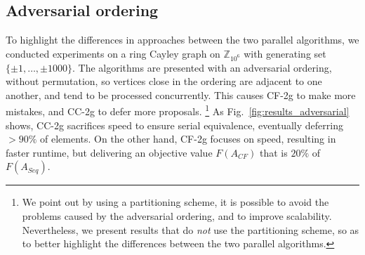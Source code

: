 \documentclass{article} %
\newcommand{\hogwild}{CF-2g}
\newcommand{\occ}{CC-2g}
\newcommand{\hogwildshort}{CF}
\newcommand{\seqalgshort}{Seq}
\newcommand{\Comments}{1}
\newcommand{\note}[2]{\ifnum\Comments=1\textcolor{#1}{#2}\fi}
\newcommand{\xinghao}[1]{\note{red}{[XP: #1]}}
\newcommand{\figref}[1]{Fig.~\ref{#1}}
\begin{document}
\subsection{Adversarial ordering}

To highlight the differences in approaches between the two parallel algorithms, we conducted experiments on a ring Cayley graph on $\mathbb{Z}_{10^6}$ with generating set $\{\pm 1,\dots, \pm 1000\}$.
The algorithms are presented with an adversarial ordering, without permutation, so vertices close in the ordering are adjacent to one another, and tend to be processed concurrently.
This causes \hogwild{} to make more mistakes, and \occ{} to defer more proposals.
\footnote{
We point out by using a partitioning scheme, it is possible to avoid the problems caused by the adversarial ordering, and to improve scalability.
Nevertheless, we present results that do \emph{not} use the partitioning scheme, so as to better highlight the differences between the two parallel algorithms.
}
As \figref{fig:results_adversarial} shows, \occ{}  sacrifices speed to ensure serial equivalence, eventually deferring $>90\%$ of elements.
On the other hand, \hogwild{} focuses on speed, resulting in faster runtime, but delivering an objective value $F(A_{\hogwildshort{}})$ that is $20\%$ of $F(A_{\seqalgshort{}})$.
\end{document}
